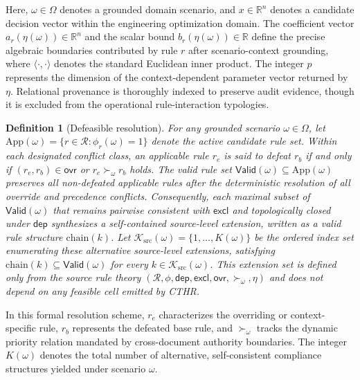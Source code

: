 ﻿\documentclass[a4paper,fleqn]{cas-dc}
\newtheorem{definition}{Definition}
\newcommand{\RR}{\mathbb{R}}
\newcommand{\calR}{\mathcal{R}}
\newcommand{\Valid}{\mathsf{Valid}}
\newcommand{\chain}{\mathrm{chain}}
\newcommand{\CTHR}{\textsc{CTHR}}
\begin{document}
Here, $\omega\in\Omega$ denotes a grounded domain scenario, and $x\in\RR^n$ denotes a candidate decision vector within the engineering optimization domain. The coefficient vector $a_r(\eta(\omega))\in\RR^n$ and the scalar bound $b_r(\eta(\omega))\in\RR$ define the precise algebraic boundaries contributed by rule $r$ after scenario-context grounding, where $\langle\cdot,\cdot\rangle$ denotes the standard Euclidean inner product. The integer $p$ represents the dimension of the context-dependent parameter vector returned by $\eta$. Relational provenance is thoroughly indexed to preserve audit evidence, though it is excluded from the operational rule-interaction typologies.

\begin{definition}[Defeasible resolution]
For any grounded scenario $\omega\in\Omega$, let $\mathrm{App}(\omega) = \{r\in\calR : \phi_r(\omega)=1\}$ denote the active candidate rule set. Within each designated conflict class, an applicable rule $r_e$ is said to \emph{defeat} $r_b$ if and only if $(r_e,r_b)\in\mathsf{ovr}$ or $r_e \succ_\omega r_b$ holds. The \emph{valid rule set} $\Valid(\omega) \subseteq \mathrm{App}(\omega)$ preserves all non-defeated applicable rules after the deterministic resolution of all override and precedence conflicts. Consequently, each maximal subset of $\Valid(\omega)$ that remains pairwise consistent with $\mathsf{excl}$ and topologically closed under $\mathsf{dep}$ synthesizes a self-contained source-level extension, written as a \emph{valid rule structure} $\chain(k)$. Let $\mathcal{K}_{\mathrm{src}}(\omega) = \{1,\ldots,K(\omega)\}$ be the ordered index set enumerating these alternative source-level extensions, satisfying $\chain(k)\subseteq\Valid(\omega)$ for every $k\in\mathcal{K}_{\mathrm{src}}(\omega)$. This extension set is defined only from the source rule theory $(\calR,\phi,\mathsf{dep},\mathsf{excl},\mathsf{ovr},\succ_\omega,\eta)$ and does not depend on any feasible cell emitted by \CTHR{}.
\end{definition}

In this formal resolution scheme, $r_e$ characterizes the overriding or context-specific rule, $r_b$ represents the defeated base rule, and $\succ_\omega$ tracks the dynamic priority relation mandated by cross-document authority boundaries. The integer $K(\omega)$ denotes the total number of alternative, self-consistent compliance structures yielded under scenario $\omega$.
\end{document}
